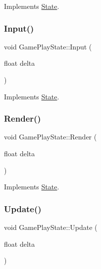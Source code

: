 Implements \hyperlink{classState_a7ab4d8c6aa239a17ed579d89a209b156}{State}.

\mbox{\label{classGamePlayState_a3bc9231fd11546b5dd13581ed2aa1afa}} 
\subsubsection{\texorpdfstring{Input()}{Input()}}
{\footnotesize\ttfamily void Game\+Play\+State\+::\+Input (\begin{DoxyParamCaption}\item[{float}]{delta }\end{DoxyParamCaption})\hspace{0.3cm}{\ttfamily [virtual]}}



Implements \hyperlink{classState_a1705412877f37a5cc8fc712542756076}{State}.

\mbox{\label{classGamePlayState_a4bd296aa04088a3d8249f569e86f21a7}} 
\subsubsection{\texorpdfstring{Render()}{Render()}}
{\footnotesize\ttfamily void Game\+Play\+State\+::\+Render (\begin{DoxyParamCaption}\item[{float}]{delta }\end{DoxyParamCaption})\hspace{0.3cm}{\ttfamily [virtual]}}



Implements \hyperlink{classState_a0e48dfae1e3090630475812681417c5f}{State}.

\mbox{\label{classGamePlayState_a19bcc1ff2a83a3aa001010ae35d67b85}} 
\subsubsection{\texorpdfstring{Update()}{Update()}}
{\footnotesize\ttfamily void Game\+Play\+State\+::\+Update (\begin{DoxyParamCaption}\item[{float}]{delta }\end{DoxyParamCaption})\hspace{0.3cm}{\ttfamily [virtual]}}



